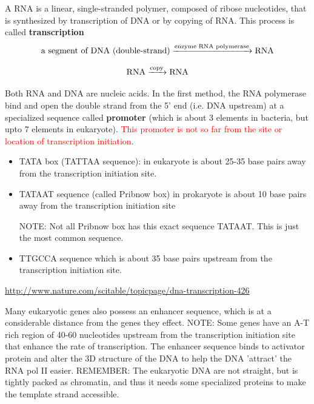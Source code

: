 A RNA is a linear, single-stranded polymer, composed of ribose nucleotides, that
is synthesized by transcription of DNA or by copying of RNA. This process is
called {\bf transcription}
\begin{equation}
\ce{ \text{a segment of DNA (double-strand)} ->[\text{enzyme RNA polymerase}]
RNA}
\end{equation} 

\begin{equation}
\ce{RNA ->[\text{copy}] RNA}
\end{equation}

Both RNA and DNA are nucleic acids. In the first method, the RNA
polymerase bind and open the double strand from the 5' end (i.e. DNA
upstream) at a specialized sequence called {\bf promoter} (which is about 3
elements in bacteria, but upto 7 elements in eukaryote). \textcolor{red}{This
promoter is not so far from the site or location of transcription initiation}.

\begin{itemize}
  \item TATA box (TATTAA sequence): in eukaryote is about 25-35 base pairs away
  from the transcription initiation site.
  
  \item TATAAT sequence (called Pribnow box) in prokaryote is about 10 base
  pairs away from the transcription initiation site
   
   NOTE: Not all Pribnow box has this exact sequence TATAAT. This is just the
   most common sequence. 	
   
   \item TTGCCA sequence which is about 35 base pairs upstream from the
   transcription initiation site.
   
\end{itemize}
\url{http://www.nature.com/scitable/topicpage/dna-transcription-426}

Many eukaryotic genes also possess an enhancer sequence, which is at a
considerable distance from the genes they effect. NOTE: Some genes have an A-T
rich region of 40-60 nucleotides upstream from the transcription initiation site
that enhance the rate of transcription. The enhancer sequence binds to activator
protein and alter the 3D structure of the DNA to help the DNA 'attract' the RNA
pol II easier. REMEMBER: The eukaryotic DNA are not straight, but is tightly
packed as chromatin, and thus it needs some specialized proteins to make the
template strand accessible.

